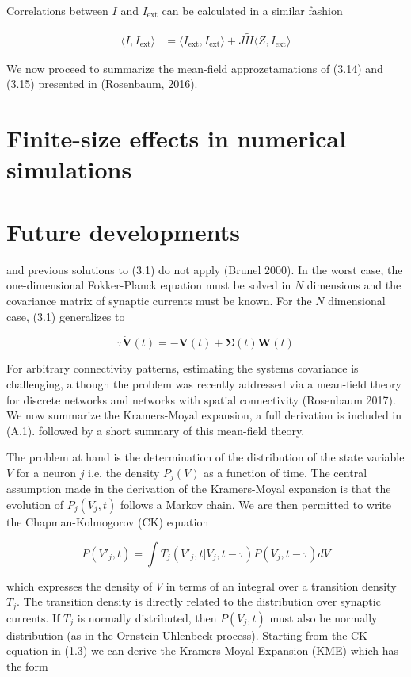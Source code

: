 \documentclass{ucetd}
\begin{document}
Correlations between $I$ and $I_{\mathrm{ext}}$ can be calculated in a similar fashion

\begin{align}
\langle I, I_{\mathrm{ext}} \rangle &= \langle I_{\mathrm{ext}}, I_{\mathrm{ext}}\rangle + J\tilde{H} \langle Z, I_{\mathrm{ext}}\rangle
\end{align}

We now proceed to summarize the mean-field approzetamations of (3.14) and (3.15) presented in (Rosenbaum, 2016). 

\section{Finite-size effects in numerical simulations}

\section{Future developments}
and previous solutions to (3.1) do not apply (Brunel 2000). In the worst case, the one-dimensional Fokker-Planck equation must be solved in $N$ dimensions and the covariance matrix of synaptic currents must be known. For the $N$ dimensional case, (3.1) generalizes to 

\begin{equation}
\tau\dot{\mathbf{V}}(t) = -\mathbf{V}(t) + \mathbf{\Sigma}(t)\mathbf{W}(t)
\end{equation}

For arbitrary connectivity patterns, estimating the systems covariance is challenging, although the problem was recently addressed via a mean-field theory for discrete networks and networks with spatial connectivity (Rosenbaum 2017). We now summarize the Kramers-Moyal expansion, a full derivation is included in (A.1). followed by a short summary of this mean-field theory.

The problem at hand is the determination of the distribution of the state variable $V$ for a neuron $j$ i.e. the density $P_{j}(V)$ as a function of time. The central assumption made in the derivation of the Kramers-Moyal expansion is that the evolution of $P_{j}(V_{j},t)$ follows a Markov chain. We are then permitted to write the Chapman-Kolmogorov (CK) equation

\begin{equation}
P(V'_{j}, t) = \int T_{j}(V'_{j}, t | V_{j}, t-\tau)P(V_{j}, t-\tau)dV
\end{equation} 

which expresses the density of $V$ in terms of an integral over a transition density $T_{j}$. The transition density is directly related to the distribution over synaptic currents. If $T_{j}$ is normally distributed, then $P(V_{j},t)$ must also be normally distribution (as in the Ornstein-Uhlenbeck process). Starting from the CK equation in (1.3) we can derive the Kramers-Moyal Expansion (KME) which has the form
\end{document}
